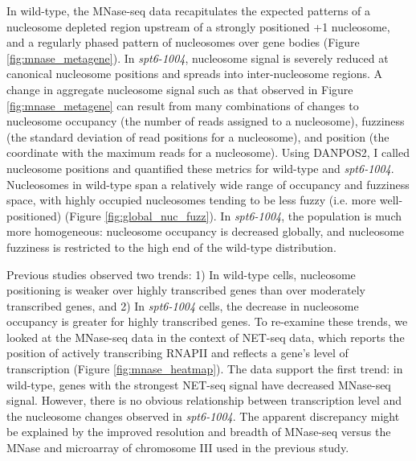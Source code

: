 \documentclass[11pt, letterpaper]{article}
\begin{document}
In wild-type, the MNase-seq data recapitulates the expected patterns of a nucleosome depleted region upstream of a strongly positioned +1 nucleosome, and a regularly phased pattern of nucleosomes over gene bodies (Figure \ref{fig:mnase_metagene}). In \textit{spt6-1004}, nucleosome signal is severely reduced at canonical nucleosome positions and spreads into inter-nucleosome regions. A change in aggregate nucleosome signal such as that observed in Figure \ref{fig:mnase_metagene} can result from many combinations of changes to nucleosome occupancy (the number of reads assigned to a nucleosome), fuzziness (the standard deviation of read positions for a nucleosome), and position (the coordinate with the maximum reads for a nucleosome). Using DANPOS2, I called nucleosome positions and quantified these metrics for wild-type and \textit{spt6-1004}. Nucleosomes in wild-type span a relatively wide range of occupancy and fuzziness space, with highly occupied nucleosomes tending to be less fuzzy (i.e. more well-positioned) (Figure \ref{fig:global_nuc_fuzz}). In \textit{spt6-1004}, the population is much more homogeneous: nucleosome occupancy is decreased globally, and nucleosome fuzziness is restricted to the high end of the wild-type distribution.

Previous studies observed two trends: 1) In wild-type cells, nucleosome positioning is weaker over highly transcribed genes than over moderately transcribed genes, and 2) In \textit{spt6-1004} cells, the decrease in nucleosome occupancy is greater for highly transcribed genes. To re-examine these trends, we looked at the MNase-seq data in the context of NET-seq data, which reports the position of actively transcribing RNAPII and reflects a gene's level of transcription (Figure \ref{fig:mnase_heatmap}). The data support the first trend: in wild-type, genes with the strongest NET-seq signal have decreased MNase-seq signal. However, there is no obvious relationship between transcription level and the nucleosome changes observed in \textit{spt6-1004}. The apparent discrepancy might be explained by the improved resolution and breadth of MNase-seq versus the MNase and microarray of chromosome III used in the previous study.
\end{document}
